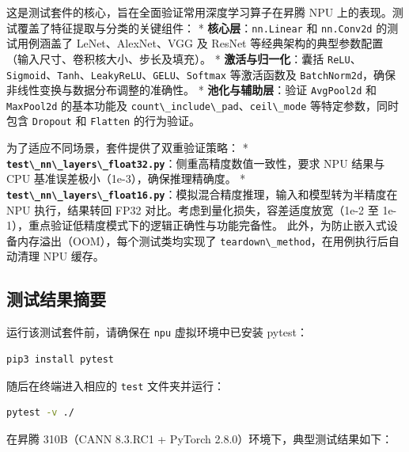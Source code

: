 这是测试套件的核心，旨在全面验证常用深度学习算子在昇腾 NPU
上的表现。测试覆盖了特征提取与分类的关键组件： *
\textbf{核心层}：\passthrough{\lstinline!nn.Linear!} 和
\passthrough{\lstinline!nn.Conv2d!} 的测试用例涵盖了 LeNet、AlexNet、VGG
及 ResNet 等经典架构的典型参数配置（输入尺寸、卷积核大小、步长及填充）。
* \textbf{激活与归一化}：囊括
\passthrough{\lstinline!ReLU!}、\passthrough{\lstinline!Sigmoid!}、\passthrough{\lstinline!Tanh!}、\passthrough{\lstinline!LeakyReLU!}、\passthrough{\lstinline!GELU!}、\passthrough{\lstinline!Softmax!}
等激活函数及
\passthrough{\lstinline!BatchNorm2d!}，确保非线性变换与数据分布调整的准确性。
* \textbf{池化与辅助层}：验证 \passthrough{\lstinline!AvgPool2d!} 和
\passthrough{\lstinline!MaxPool2d!} 的基本功能及
\passthrough{\lstinline!count\_include\_pad!}、\passthrough{\lstinline!ceil\_mode!}
等特定参数，同时包含 \passthrough{\lstinline!Dropout!} 和
\passthrough{\lstinline!Flatten!} 的行为验证。

为了适应不同场景，套件提供了双重验证策略： *
\textbf{\passthrough{\lstinline!test\_nn\_layers\_float32.py!}}：侧重高精度数值一致性，要求
NPU 结果与 CPU 基准误差极小（1e-3），确保推理精确度。 *
\textbf{\passthrough{\lstinline!test\_nn\_layers\_float16.py!}}：模拟混合精度推理，输入和模型转为半精度在
NPU 执行，结果转回 FP32 对比。考虑到量化损失，容差适度放宽（1e-2 至
1e-1），重点验证低精度模式下的逻辑正确性与功能完备性。
此外，为防止嵌入式设备内存溢出（OOM），每个测试类均实现了
\passthrough{\lstinline!teardown\_method!}，在用例执行后自动清理 NPU
缓存。

\subsection{测试结果摘要}\label{src-book-chapter3-h18}

运行该测试套件前，请确保在 \passthrough{\lstinline!npu!}
虚拟环境中已安装 pytest：

\begin{lstlisting}[language=bash]
pip3 install pytest
\end{lstlisting}

随后在终端进入相应的 \passthrough{\lstinline!test!} 文件夹并运行：

\begin{lstlisting}[language=bash]
pytest -v ./
\end{lstlisting}

在昇腾 310B（CANN 8.3.RC1 + PyTorch 2.8.0）环境下，典型测试结果如下：

